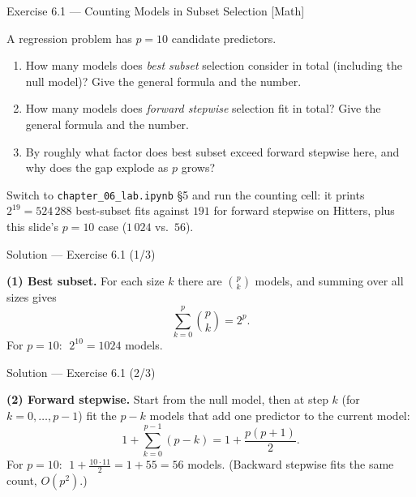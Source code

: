\documentclass[aspectratio=169,11pt]{beamer}
\begin{document}
\begin{frame}{Exercise 6.1 --- Counting Models in Subset Selection [Math]}
  \begin{exercise}
    A regression problem has $p = 10$ candidate predictors.
    \begin{enumerate}
      \item How many models does \emph{best subset} selection consider
            in total (including the null model)? Give the general
            formula and the number.
      \item How many models does \emph{forward stepwise} selection fit
            in total? Give the general formula and the number.
      \item By roughly what factor does best subset exceed forward
            stepwise here, and why does the gap explode as $p$ grows?
    \end{enumerate}
  \end{exercise}
  \begin{labnote}
    Switch to \texttt{chapter\_06\_lab.ipynb} \S5 and run the counting cell: it prints
    $2^{19} = 524\,288$ best-subset fits against $191$ for forward stepwise on Hitters,
    plus this slide's $p=10$ case ($1\,024$ vs.\ $56$).
  \end{labnote}
\end{frame}

\begin{frame}{Solution --- Exercise 6.1 (1/3)}
  \begin{solutionbox}
    \textbf{(1) Best subset.}
    For each size $k$ there are $\binom{p}{k}$ models, and summing over
    all sizes gives
    \[
      \sum_{k=0}^{p}\binom{p}{k} = 2^{p} .
    \]
    For $p = 10$: $\;2^{10} = 1024$ models.
  \end{solutionbox}
\end{frame}

\begin{frame}{Solution --- Exercise 6.1 (2/3)}
  \begin{solutionbox}
    \textbf{(2) Forward stepwise.}
    Start from the null model, then at step $k$ (for
    $k = 0,\dots,p-1$) fit the $p - k$ models that add one predictor to
    the current model:
    \[
      1 + \sum_{k=0}^{p-1}(p-k) = 1 + \frac{p(p+1)}{2} .
    \]
    For $p = 10$: $\;1 + \tfrac{10\cdot 11}{2} = 1 + 55 = 56$ models.
    (Backward stepwise fits the same count, $O(p^2)$.)
  \end{solutionbox}
\end{frame}
\end{document}
